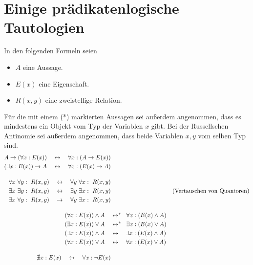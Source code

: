 \section{Einige prädikatenlogische Tautologien}
In den folgenden Formeln seien
\begin{itemize}
    \item $A$ eine Aussage.
    \item $E(x)$ eine Eigenschaft.
    \item $R(x,y)$ eine zweistellige Relation.
\end{itemize}
Für die mit einem (*) markierten Aussagen sei außerdem angenommen, dass es mindestens ein Objekt vom Typ der Variablen $x$ gibt. Bei der Russellschen Antinomie sei außerdem angenommen, dass beide Variablen $x,y$ vom selben Typ sind.
\begingroup
\allowdisplaybreaks
\begin{align*}
    \begin{split}
        A \to (\forall x : E(x)) \quad & \leftrightarrow\quad \forall x : (A \to E(x)) \\
        (\exists x : E(x)) \to A \quad & \leftrightarrow\quad \forall x : (E(x) \to A)
    \end{split} \\[1em]
    \begin{split}
        \forall x\ \forall y:\ R(x,y) \quad & \leftrightarrow\quad \forall y\ \forall x:\ R(x,y) \\
        \exists x\ \exists y:\ R(x,y) \quad & \leftrightarrow\quad \exists y\ \exists x:\ R(x,y) \\
        \exists x\ \forall y:\ R(x,y) \quad & \to\quad \forall y\ \exists x:\ R(x,y)
    \end{split} && (\text{Vertauschen von Quantoren}) \\[1em]
    (\forall x : E(x)) \land A \quad & \leftrightarrow^* \quad\hspace{-.4em} \forall x :(E(x) \land A) \\
    (\exists x : E(x)) \lor A \quad & \leftrightarrow^* \quad\hspace{-.4em} \exists x : (E(x) \lor A) \\
    (\exists x : E(x)) \land A \quad & \leftrightarrow\quad \exists x : (E(x) \land A) \\
    (\forall x : E(x)) \lor A \quad & \leftrightarrow\quad \forall x :(E(x) \lor A) \\[1em] %
    \begin{split}
        \nexists x: E(x) \quad & \leftrightarrow\quad \forall x: \neg E(x) \\

\end{split}
\end{align*}
